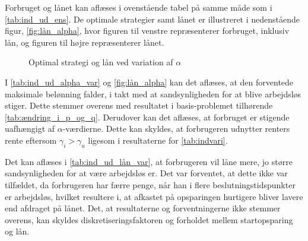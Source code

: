 

Forbruget og lånet kan aflæses i ovenstående tabel på samme måde som i \autoref{tab:ind_ud_ens}. De optimale strategier samt lånet er illustreret i nedenstående figur, \autoref{fig:lån_alpha}, hvor figuren til venstre repræsenterer forbruget, inklusiv lån, og figuren til højre repræsenterer lånet. 


\begin{figure}[H]
    \begin{center}
        \resizebox{8cm}{!}{}
        \resizebox{8cm}{!}{}
    \end{center}
    \caption{Optimal strategi og lån ved variation af $\alpha$}\label{fig:lån_alpha}
\end{figure}
 
I \autoref{tab:ind_ud_alpha_var} og \autoref{fig:lån_alpha} kan det aflæses, at den forventede maksimale belønning falder, i takt med at sandsynligheden for at blive arbejdsløs stiger. Dette stemmer overens med resultatet i basis-problemet tilhørende \autoref{tab:ændring_i_p_og_q}. Derudover kan det aflæses, at forbruget er stigende uafhængigt af $\alpha$-værdierne. Dette kan skyldes, at forbrugeren udnytter renters rente eftersom $\gamma_i > \gamma_u$ ligesom i resultaterne for \autoref{tab:indvari}.




Det kan aflæses i \autoref{tab:ind_ud_lån_var}, at forbrugeren vil låne mere, jo større sandsynligheden for at være arbejdsløs er. Det var forventet, at dette ikke var tilfældet, da forbrugeren har færre penge, når han i flere beslutningstidspunkter er arbejdsløs, hvilket resultere i, at afkastet på opsparingen hurtigere bliver lavere end afdraget på lånet. Det, at resultaterne og forventningerne ikke stemmer overens, kan skyldes diskretiseringsfaktoren og forholdet mellem startopsparing og lån. 

